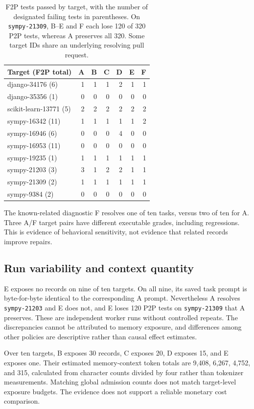 \documentclass[sigconf,anonymous]{aamas}
\begin{document}
\begin{table}[t]
\caption{F2P tests passed by target, with the number of designated failing tests in parentheses. On \texttt{sympy-21309}, B--E and F each lose 120 of 320 P2P tests, whereas A preserves all 320. Some target IDs share an underlying resolving pull request.}
\label{tab:targets}
\centering
\scriptsize
\setlength{\tabcolsep}{2pt}
\begin{tabular}{lrrrrrr}
\toprule
Target (F2P total) & A & B & C & D & E & F\\
\midrule
django-34176 (6) & 1 & 1 & 1 & 2 & 1 & 1\\
django-35356 (1) & 0 & 0 & 0 & 0 & 0 & 0\\
scikit-learn-13771 (5) & 2 & 2 & 2 & 2 & 2 & 2\\
sympy-16342 (11) & 1 & 1 & 1 & 1 & 1 & 2\\
sympy-16946 (6) & 0 & 0 & 0 & 4 & 0 & 0\\
sympy-16953 (11) & 0 & 0 & 0 & 0 & 0 & 0\\
sympy-19235 (1) & 1 & 1 & 1 & 1 & 1 & 1\\
sympy-21203 (3) & 3 & 1 & 2 & 2 & 1 & 1\\
sympy-21309 (2) & 1 & 1 & 1 & 1 & 1 & 1\\
sympy-9384 (2) & 0 & 0 & 0 & 0 & 0 & 0\\
\bottomrule
\end{tabular}
\end{table}

The known-related diagnostic F resolves one of ten tasks, versus two of ten for A. Three A/F target pairs have different executable grades, including regressions. This is evidence of behavioral sensitivity, not evidence that related records improve repairs.

\subsection{Run variability and context quantity}
E exposes no records on nine of ten targets. On all nine, its saved task prompt is byte-for-byte identical to the corresponding A prompt. Nevertheless A resolves \texttt{sympy-21203} and E does not, and E loses 120 P2P tests on \texttt{sympy-21309} that A preserves. These are independent worker runs without controlled repeats. The discrepancies cannot be attributed to memory exposure, and differences among other policies are descriptive rather than causal effect estimates.

Over ten targets, B exposes 30 records, C exposes 20, D exposes 15, and E exposes one. Their estimated memory-context token totals are 9,408, 6,267, 4,752, and 315, calculated from character counts divided by four rather than tokenizer measurements. Matching global admission counts does not match target-level exposure budgets. The evidence does not support a reliable monetary cost comparison.
\end{document}
